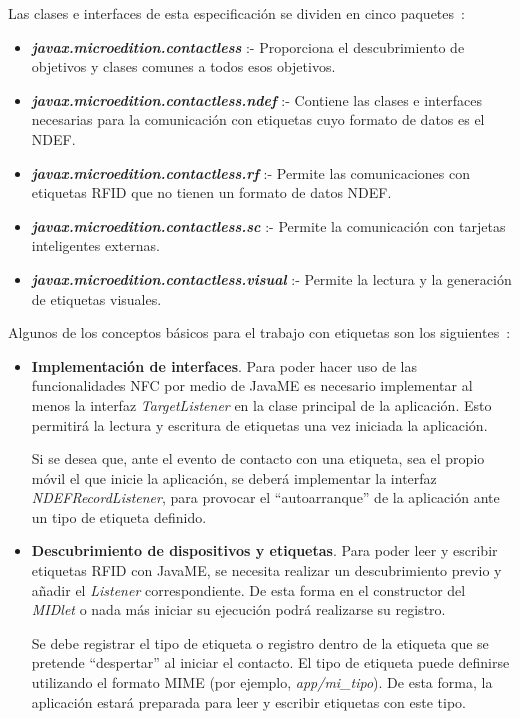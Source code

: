 \begin{itemize}
Las clases e interfaces de esta especificación se dividen en cinco
paquetes~\cite{bib:jsr257}:
\begin{itemize}
\item \emph{\textbf{javax.microedition.contactless}} :- Proporciona el 
descubrimiento de objetivos y clases comunes a todos esos objetivos.
\item \emph{\textbf{javax.microedition.contactless.ndef}} :- Contiene las 
clases e interfaces necesarias para la comunicación con etiquetas cuyo formato 
de datos es el \acs{NDEF}.
\item \emph{\textbf{javax.microedition.contactless.rf}} :- Permite las 
comunicaciones con etiquetas \acs{RFID} que no tienen un formato de datos
\acs{NDEF}.
\item \emph{\textbf{javax.microedition.contactless.sc}} :- Permite la 
comunicación con tarjetas inteligentes externas.
\item \emph{\textbf{javax.microedition.contactless.visual}} :- Permite la 
lectura y la generación de etiquetas visuales.
\end{itemize}

Algunos de los conceptos básicos para el trabajo con etiquetas son los
siguientes~\cite{bib:jfontecha}:
\begin{itemize}
\item \textbf{Implementación de interfaces}. Para poder hacer uso de las 
funcionalidades \acs{NFC} por medio de \acs{JavaME}
es necesario implementar al menos la interfaz \emph{TargetListener} en la
clase principal de la aplicación. Esto permitirá la lectura y escritura de
etiquetas una vez iniciada la aplicación.

Si se desea que, ante el evento de contacto con una etiqueta, sea el propio
móvil el que inicie la aplicación, se deberá implementar la interfaz
\emph{NDEFRecordListener}, para provocar el ``autoarranque'' de la aplicación
ante un tipo de etiqueta definido.

\item \textbf{Descubrimiento de dispositivos y etiquetas}. Para poder leer y 
escribir etiquetas \acs{RFID} con \acs{JavaME}, se necesita realizar un 
descubrimiento previo y añadir el \emph{Listener} correspondiente. De esta 
forma en el constructor del \emph{MIDlet} o nada más iniciar su ejecución 
podrá realizarse su registro.

Se debe registrar el tipo de etiqueta o registro dentro de la etiqueta que
se pretende ``despertar'' al iniciar el contacto. El tipo de etiqueta puede
definirse utilizando el formato \acs{MIME} (por ejemplo, \emph{app/mi\_tipo}).
De esta forma, la aplicación estará preparada para leer y escribir etiquetas
con este tipo.


\end{itemize}
\end{itemize}

